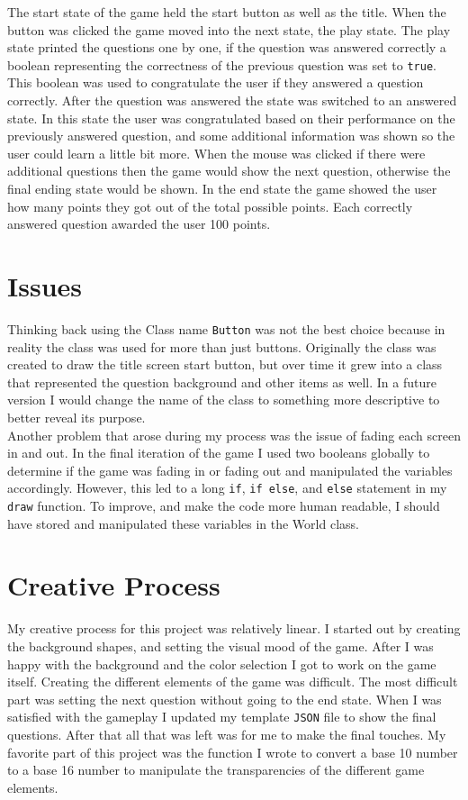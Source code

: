 \documentclass[12 pt]{report}
\begin{document}
\hspace{\parindent} The start state of the game held the start button as well as the title. When the button was clicked the game moved into the next state, the play state. The play state printed the questions one by one, if the question was answered correctly a boolean representing the correctness of the previous question was set to \verb|true|. This boolean was used to congratulate the user if they answered a question correctly. After the question was answered the state was switched to an answered state. In this state the user was congratulated based on their performance on the previously answered question, and some additional information was shown so the user could learn a little bit more. When the mouse was clicked if there were additional questions then the game would show the next question, otherwise the final ending state would be shown. In the end state the game showed the user how many points they got out of the total possible points. Each correctly answered question awarded the user 100 points.

\section{Issues}
\hspace{\parindent} Thinking back using the Class name \verb|Button| was not the best choice because in reality the class was used for more than just buttons. Originally the class was created to draw the title screen start button, but over time it grew into a class that represented the question background and other items as well. In a future version I would change the name of the class to something more descriptive to better reveal its purpose.\\ 
\hspace{\parindent} Another problem that arose during my process was the issue of fading each screen in and out. In the final iteration of the game I used two booleans globally to determine if the game was fading in or fading out and manipulated the variables accordingly. However, this led to a long \verb|if|, \verb|if else|, and \verb|else| statement in my \verb|draw| function. To improve, and make the code more human readable, I should have stored and manipulated these variables in the World class.

\section{Creative Process}
\hspace{\parindent} My creative process for this project was relatively linear. I started out by creating the background shapes, and setting the visual mood of the game. After I was happy with the background and the color selection I got to work on the game itself. Creating the different elements of the game was difficult. The most difficult part was setting the next question without going to the end state. When I was satisfied with the gameplay I updated my template \verb|JSON| file to show the final questions. After that all that was left was for me to make the final touches. My favorite part of this project was the function I wrote to convert a base 10 number to a base 16 number to manipulate the transparencies of the different game elements. 
\end{document}
